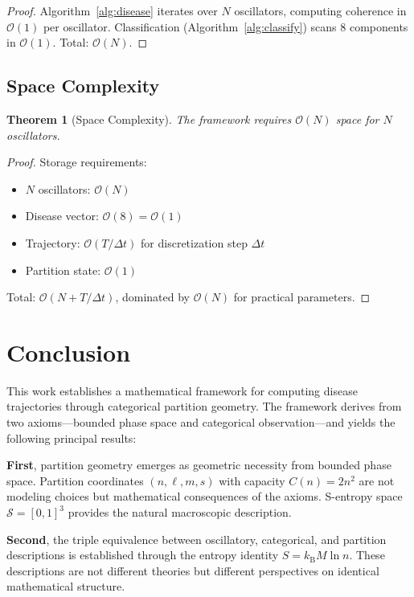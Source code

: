 \documentclass[10pt,twocolumn]{article}
\theoremstyle{plain}
\newtheorem{theorem}{Theorem}[section]
\theoremstyle{definition}
\theoremstyle{remark}
\newcommand{\kB}{k_{\mathrm{B}}}
\newcommand{\Sspace}{\mathcal{S}}
\newcommand{\bigO}{\mathcal{O}}
\begin{document}
\begin{proof}
Algorithm~\ref{alg:disease} iterates over $N$ oscillators, computing coherence in $\bigO(1)$ per oscillator. Classification (Algorithm~\ref{alg:classify}) scans 8 components in $\bigO(1)$. Total: $\bigO(N)$.
\end{proof}

\subsection{Space Complexity}

\begin{theorem}[Space Complexity]
\label{thm:space}
The framework requires $\bigO(N)$ space for $N$ oscillators.
\end{theorem}

\begin{proof}
Storage requirements:
\begin{itemize}
\item $N$ oscillators: $\bigO(N)$
\item Disease vector: $\bigO(8) = \bigO(1)$
\item Trajectory: $\bigO(T/\Delta t)$ for discretization step $\Delta t$
\item Partition state: $\bigO(1)$
\end{itemize}
Total: $\bigO(N + T/\Delta t)$, dominated by $\bigO(N)$ for practical parameters.
\end{proof}

\section{Conclusion}
\label{sec:conclusion}

This work establishes a mathematical framework for computing disease trajectories through categorical partition geometry. The framework derives from two axioms---bounded phase space and categorical observation---and yields the following principal results:

\textbf{First}, partition geometry emerges as geometric necessity from bounded phase space. Partition coordinates $(n, \ell, m, s)$ with capacity $C(n) = 2n^2$ are not modeling choices but mathematical consequences of the axioms. S-entropy space $\Sspace = [0,1]^3$ provides the natural macroscopic description.

\textbf{Second}, the triple equivalence between oscillatory, categorical, and partition descriptions is established through the entropy identity $S = \kB M \ln n$. These descriptions are not different theories but different perspectives on identical mathematical structure.
\end{document}
